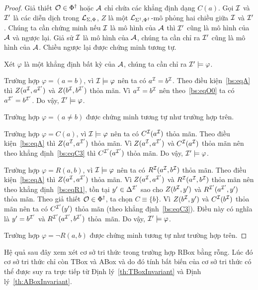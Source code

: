 \begin{proof}
	Giả thiết $\mathcal{O} \in \Phi^\dag$ hoặc $\mathcal{A}$ chỉ chứa các khẳng định dạng $C(a)$. Gọi $\mathcal{I}$ và $\mathcal{I}'$ là các diễn dịch trong $\mathcal{L}_{\Sigma,\Phi}$, $Z$ là một $\mathcal{L}_{\Sigma^\dag,\Phi^\dag}$-mô phỏng hai chiều giữa $\mathcal{I}$ và $\mathcal{I}'$. Chúng ta cần chứng minh nếu $\mathcal{I}$ là mô hình của $\mathcal{A}$ thì $\mathcal{I}'$ cũng là mô hình của $\mathcal{A}$ và ngược lại. Giả sử $\mathcal{I}$ là mô hình của $\mathcal{A}$, chúng ta cần chỉ ra $\mathcal{I}'$ cũng là mô hình của $\mathcal{A}$. Chiều ngược lại được chứng minh tương tự.
	
	Xét $\varphi$ là một khẳng định bất kỳ của $\mathcal{A}$, chúng ta cần chỉ ra $\mathcal{I}' \models \varphi$.
	
	\semiItem Trường hợp $\varphi = (a=b)$, vì $\mathcal{I} \models \varphi$ nên ta có $a^{\mathcal{I}} = b^{\mathcal{I}}$. Theo điều kiện~\eqref{bs:eqA} thì $Z(a^{\mathcal{I}}, a^{\mathcal{I}'})$ và $Z(b^{\mathcal{I}}, b^{\mathcal{I}'})$ thỏa mãn. Vì $a^{\mathcal{I}} = b^{\mathcal{I}}$ nên theo~\eqref{bs:eqO0} ta có $a^{\mathcal{I}'} = b^{\mathcal{I}'}$. Do vậy, $\mathcal{I}' \models \varphi$.
	
	\semiItem Trường hợp $\varphi = (a\not=b)$ được chứng minh tương tự như trường hợp trên.
	
	\semiItem Trường hợp $\varphi = C(a)$, vì $\mathcal{I} \models \varphi$ nên ta có $C^{\mathcal{I}}(a^{\mathcal{I}})$ thỏa mãn. Theo điều kiện~\eqref{bs:eqA} thì $Z(a^{\mathcal{I}}, a^{\mathcal{I}'})$ thỏa mãn. Vì $Z(a^{\mathcal{I}}, a^{\mathcal{I}'})$ và $C^{\mathcal{I}}(a^{\mathcal{I}})$ thỏa mãn nên theo khẳng định~\eqref{bs:eqC3} thì $C^{\mathcal{I}'}(a^{\mathcal{I}'})$ thỏa mãn. Do vậy, $\mathcal{I}' \models \varphi$.
	
	\semiItem Trường hợp $\varphi = R(a,b)$, vì $\mathcal{I} \models \varphi$ nên ta có $R^{\mathcal{I}}(a^{\mathcal{I}}, b^{\mathcal{I}})$ thỏa mãn. Theo điều kiện~\eqref{bs:eqA} thì $Z(a^{\mathcal{I}}, a^{\mathcal{I}'})$ thỏa mãn. Vì $Z(a^{\mathcal{I}}, a^{\mathcal{I}'})$ và $R^{\mathcal{I}}(a^{\mathcal{I}}, b^{\mathcal{I}})$ thỏa mãn nên theo khẳng định~\eqref{bs:eqR1}, tồn tại $y' \in \Delta^{\mathcal{I}'}$ sao cho $Z(b^{\mathcal{I}}, y')$ và $R^{\mathcal{I}'}(a^{\mathcal{I}'}, y')$ thỏa mãn. Theo giả thiết $\mathcal{O} \in \Phi^\dag$, ta chọn $C \equiv \{b\}$. Vì $Z(b^{\mathcal{I}}, y')$ và $C^{\mathcal{I}}(b^{\mathcal{I}})$ thỏa mãn nên ta có $C^{\mathcal{I}'}(y')$ thỏa mãn (theo khẳng định~\eqref{bs:eqC3}). Điều này có nghĩa là $y' = b^{\mathcal{I}'}$ và $R^{\mathcal{I}'}(a^{\mathcal{I}'},b^{\mathcal{I}'})$ thỏa~mãn. Do vậy, $\mathcal{I}' \models \varphi$.
	
	\semiItem Trường hợp $\varphi = \neg R(a,b)$ được chứng minh tương tự như trường hợp trên.
\end{proof}

Hệ quả sau đây xem xét cơ sở tri thức trong trường hợp RBox bằng rỗng. Lúc đó cơ sở tri thức chỉ còn TBox và ABox và do đó tính bất biến của cơ sở tri thức có thể được suy ra trực tiếp từ Định lý~\ref{th:TBoxInvariant} và Định lý~\ref{th:ABoxInvariant}.

